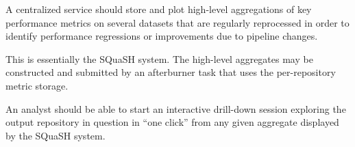 \begin{recommendation}
A centralized service should store and plot high-level aggregations of key performance metrics on several datasets that are regularly reprocessed in order to identify performance regressions or improvements due to pipeline changes.
\end{recommendation}

This is essentially the SQuaSH system.  
The high-level aggregates may be constructed and submitted by an afterburner task that uses the per-repository metric storage.


\begin{recommendation}
An analyst should be able to start an interactive drill-down session exploring the output repository in question in ``one click'' from any given aggregate displayed by the SQuaSH system.
\end{recommendation}
